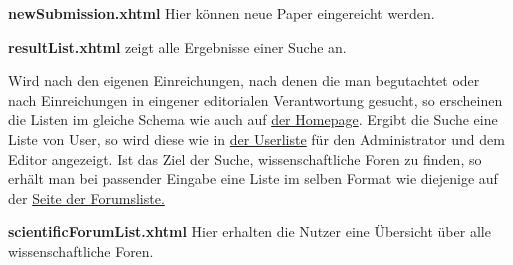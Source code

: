 \begin{samepage}
    \textbf{newSubmission.xhtml} Hier können neue Paper eingereicht werden.
    \nopagebreak

\end{samepage}

\begin{samepage}
    \textbf{resultList.xhtml} zeigt alle Ergebnisse einer Suche an.
    \nopagebreak

    Wird nach den eigenen Einreichungen, nach denen die man begutachtet oder nach Einreichungen in eingener editorialen Verantwortung gesucht, so erscheinen die Listen im gleiche Schema wie auch auf \hyperref[flt:homepage]{der Homepage}.
    Ergibt die Suche eine Liste von User, so wird diese wie in \hyperref[flt:userList]{der Userliste} für den Administrator und dem Editor angezeigt.
    Ist das Ziel der Suche, wissenschaftliche Foren zu finden, so erhält man bei passender Eingabe eine Liste im selben Format wie diejenige auf der \hyperref[flt:forumList]{Seite der Forumsliste.}
\end{samepage}

\begin{samepage}

    \textbf{scientificForumList.xhtml}  \label{flt:forumList} Hier erhalten die Nutzer eine Übersicht über alle wissenschaftliche Foren.\nopagebreak

\end{samepage}

